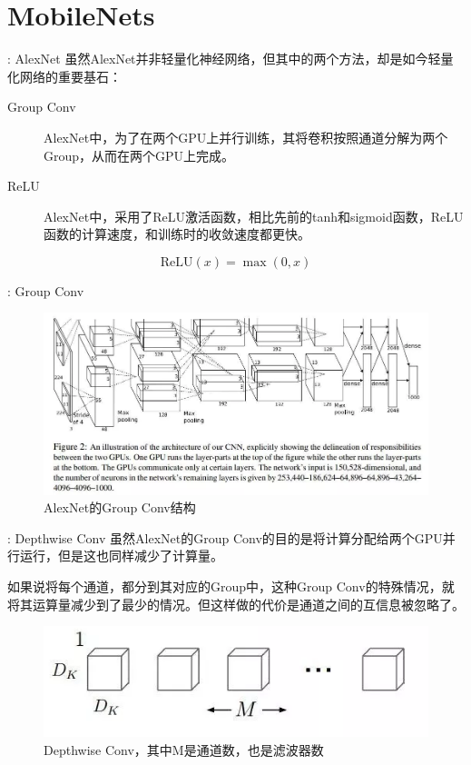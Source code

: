 \documentclass[UTF8, fontset=founder, aspectratio=43, 10pt, t]{ctexbeamer}
\begin{document}
\section{MobileNets}

\begin{frame}{\titleprefix: AlexNet}
	虽然AlexNet并非轻量化神经网络，但其中的两个方法，却是如今轻量化网络的重要基石：
	\begin{description}
		\item[Group Conv] AlexNet中，为了在两个GPU上并行训练，其将卷积按照通道分解为两个Group，从而在两个GPU上完成。
		\item[ReLU] AlexNet中，采用了ReLU激活函数，相比先前的tanh和sigmoid函数，ReLU函数的计算速度，和训练时的收敛速度都更快。
	\end{description}
	\[
	\text{ReLU}(x)=\max (0, x)
	\]
	
\end{frame}

\begin{frame}{\titleprefix: Group Conv}
	\begin{figure}
		\centering
		\includegraphics[width=0.9\linewidth]{Images/groupconv_1}
		\caption{AlexNet的Group Conv结构}
		\label{fig:groupconv1}
	\end{figure}

\end{frame}

\begin{frame}{\titleprefix: Depthwise Conv}
	虽然AlexNet的Group Conv的目的是将计算分配给两个GPU并行运行，但是这也同样减少了计算量。
	
	如果说将每个通道，都分到其对应的Group中，这种Group Conv的特殊情况，就将其运算量减少到了最少的情况。但这样做的代价是通道之间的互信息被忽略了。
	\begin{figure}
		\centering
		\includegraphics[width=0.7\linewidth]{Images/depthwise_1}
		\caption{Depthwise Conv，其中M是通道数，也是滤波器数}
		\label{fig:depthwise1}
	\end{figure}
	
\end{frame}
\end{document}
